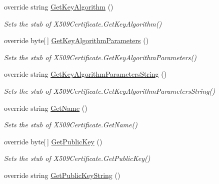\begin{DoxyCompactItemize}
override string \hyperlink{class_system_1_1_security_1_1_cryptography_1_1_x509_certificates_1_1_fakes_1_1_stub_x509_certificate2_a1134bc100e00d0762dc47a72c09b666c}{Get\-Key\-Algorithm} ()
\begin{DoxyCompactList}\small\item\em Sets the stub of X509\-Certificate.\-Get\-Key\-Algorithm()\end{DoxyCompactList}\item 
override byte\mbox{[}$\,$\mbox{]} \hyperlink{class_system_1_1_security_1_1_cryptography_1_1_x509_certificates_1_1_fakes_1_1_stub_x509_certificate2_a96bc147d432edac8f59f9e7de3afb973}{Get\-Key\-Algorithm\-Parameters} ()
\begin{DoxyCompactList}\small\item\em Sets the stub of X509\-Certificate.\-Get\-Key\-Algorithm\-Parameters()\end{DoxyCompactList}\item 
override string \hyperlink{class_system_1_1_security_1_1_cryptography_1_1_x509_certificates_1_1_fakes_1_1_stub_x509_certificate2_a179c06754fe5cb2698954e1e369aa3dc}{Get\-Key\-Algorithm\-Parameters\-String} ()
\begin{DoxyCompactList}\small\item\em Sets the stub of X509\-Certificate.\-Get\-Key\-Algorithm\-Parameters\-String()\end{DoxyCompactList}\item 
override string \hyperlink{class_system_1_1_security_1_1_cryptography_1_1_x509_certificates_1_1_fakes_1_1_stub_x509_certificate2_ab9c7e61b8e74996d0299c4965738f9c1}{Get\-Name} ()
\begin{DoxyCompactList}\small\item\em Sets the stub of X509\-Certificate.\-Get\-Name()\end{DoxyCompactList}\item 
override byte\mbox{[}$\,$\mbox{]} \hyperlink{class_system_1_1_security_1_1_cryptography_1_1_x509_certificates_1_1_fakes_1_1_stub_x509_certificate2_a7818429df960550587c0994dc4bc044e}{Get\-Public\-Key} ()
\begin{DoxyCompactList}\small\item\em Sets the stub of X509\-Certificate.\-Get\-Public\-Key()\end{DoxyCompactList}\item 
override string \hyperlink{class_system_1_1_security_1_1_cryptography_1_1_x509_certificates_1_1_fakes_1_1_stub_x509_certificate2_a72f9687c686ceaf9576a0d7310b1d3a8}{Get\-Public\-Key\-String} ()

\end{DoxyCompactItemize}
